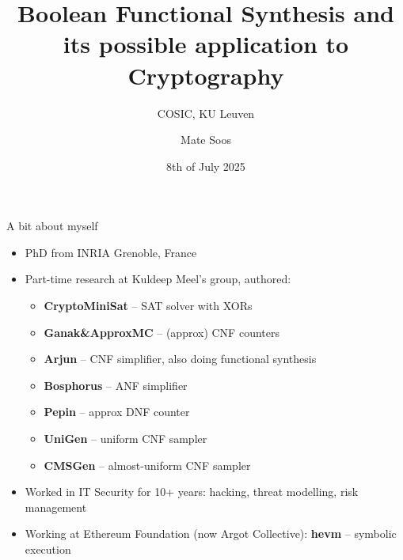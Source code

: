 \documentclass[aspectratio=169]{beamer}
\title[Func. Synthesis]{
Boolean Functional Synthesis and its possible application to Cryptography}
\author[Soos]{Mate Soos}
\institute[Argot]{\large Argot Collective (\url{https://argot.org})}
\date{8th of July 2025}
\subtitle{COSIC, KU Leuven}
\begin{document}
\begin{frame}
    \titlepage
\end{frame}

\begin{frame}{A bit about myself}
\begin{itemize}
\item PhD from INRIA Grenoble, France
\item Part-time research at Kuldeep Meel's group, authored:
    \begin{itemize}
        \item \textbf{CryptoMiniSat} -- SAT solver with XORs
        \item \textbf{Ganak\&ApproxMC} -- (approx) CNF counters
        \item \textbf{Arjun} -- CNF simplifier, also doing functional synthesis
        \item \textbf{Bosphorus} -- ANF simplifier
        \item \textbf{Pepin} -- approx DNF counter
        \item \textbf{UniGen} -- uniform CNF sampler
        \item \textbf{CMSGen} -- almost-uniform CNF sampler
    \end{itemize}
\item Worked in IT Security for 10+ years: hacking,
    threat modelling, risk management
\item Working at Ethereum Foundation (now Argot Collective):
    \textbf{hevm} -- symbolic execution
\end{itemize}
\end{frame}

\end{document}
